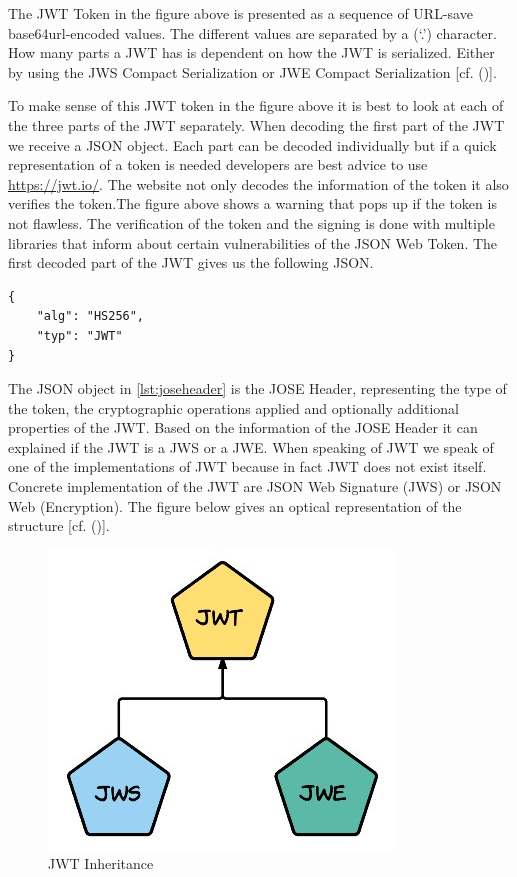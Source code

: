 The JWT Token in the figure above is presented as a sequence of URL-save base64url-encoded values. The different values are separated by a (‘.’) character. How many parts a JWT has is dependent on how the JWT is serialized. Either by using the JWS Compact Serialization or JWE Compact Serialization  [cf. (\cite{JWT:IETF:Jones:2015})].


To make sense of this JWT token in the figure above it is best to look at each of the three parts of the JWT separately. When decoding the first part of the JWT we receive a JSON object. Each part can be decoded individually but if a quick representation of a token is needed developers are best advice to use \href{https://jwt.io/} {https://jwt.io/}. The website not only decodes the information of the token it also verifies the token.The figure above shows a warning that pops up if the token is not flawless. The verification of the token and the signing is done with multiple libraries that inform about certain vulnerabilities of the JSON Web Token. The first decoded part of the JWT gives us the following JSON.


\begin{lstlisting}
{
	"alg": "HS256",
	"typ": "JWT"
}
\end{lstlisting}


The JSON object in \ref{lst:joseheader} is the JOSE Header, representing the type of the token, the cryptographic operations applied and optionally additional properties of the JWT. Based on the information of the JOSE Header it can explained if the JWT is a JWS or a JWE. When speaking of JWT we speak of one of the implementations of JWT because in fact JWT does not exist itself. Concrete implementation of the JWT are JSON Web Signature (JWS) or JSON Web (Encryption). The figure below gives an optical representation of the structure [cf. (\cite{Siriwardena:JWTJWSJWE:2016})].


\begin{figure}[h]
\centering
\includegraphics[width=0.6\linewidth]{images/jwtjwsjwe}
\caption[JWT Inheritence]{JWT Inheritance}
\label{fig:jwtjwsjwe}
\end{figure}

